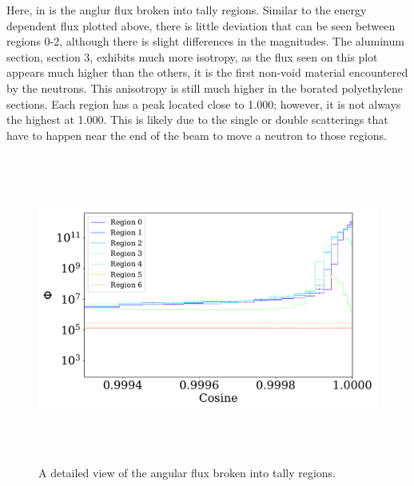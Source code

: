 Here, in  is the anglur flux broken into tally regions.
Similar to the energy dependent flux plotted above, there is little deviation that can be seen between regions 0-2, although there is slight differences in the magnitudes.
The aluminum section, section 3, exhibits much more isotropy, as the flux seen on this plot appears much higher than the others, it is the first non-void material encountered by the neutrons.
This anisotropy is still much higher in the borated polyethylene sections.
Each region has a peak located close to 1.000; however, it is not always the highest at 1.000.
This is likely due to the single or double scatterings that have to happen near the end of the beam to move a neutron to those regions.


\begin{figure}[htb]
\centering
\includegraphics[height=4in]{tex/figures/flux_rad_cos_detail.pdf}
\caption[Detailed Regional Flux vs. Angle]{A detailed view of the angular flux broken into tally regions.}
\label{fig:flux_rad_cos_detail}
\end{figure}

